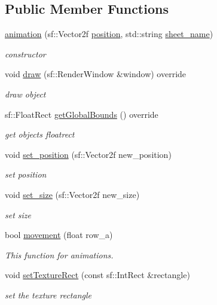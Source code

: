 \subsection*{Public Member Functions}
\begin{DoxyCompactItemize}
\item 
\hyperlink{classanimation_ab0a44a89f36d6f04c4e21e868441d693}{animation} (sf\+::\+Vector2f \hyperlink{classdrawable_a34679fa5ae82eee65dfd6b1b9f3c7cb6}{position}, std\+::string \hyperlink{classanimation_a5406569ef9a8e47a8e50a927063613f6}{sheet\+\_\+name})
\begin{DoxyCompactList}\small\item\em constructor \end{DoxyCompactList}\item 
void \hyperlink{classanimation_a20959b66d1c25007890bb40f0e876570}{draw} (sf\+::\+Render\+Window \&window) override
\begin{DoxyCompactList}\small\item\em draw object \end{DoxyCompactList}\item 
sf\+::\+Float\+Rect \hyperlink{classanimation_aae3322323bf3dea83723969f364e18e0}{get\+Global\+Bounds} () override
\begin{DoxyCompactList}\small\item\em get objects floatrect \end{DoxyCompactList}\item 
void \hyperlink{classanimation_ac461adb38b8241427150c4620ee31358}{set\+\_\+position} (sf\+::\+Vector2f new\+\_\+position)
\begin{DoxyCompactList}\small\item\em set position \end{DoxyCompactList}\item 
void \hyperlink{classanimation_a7c0b874294e81f3612590920fd845602}{set\+\_\+size} (sf\+::\+Vector2f new\+\_\+size)
\begin{DoxyCompactList}\small\item\em set size \end{DoxyCompactList}\item 
bool \hyperlink{classanimation_a79260eb98a4f77aa4b9f3b08cc8e5b59}{movement} (float row\+\_\+a)
\begin{DoxyCompactList}\small\item\em This function for animations. \end{DoxyCompactList}\item 
void \hyperlink{classanimation_a30e84ff71206b8ec4f82fd70ad776036}{set\+Texture\+Rect} (const sf\+::\+Int\+Rect \&rectangle)
\begin{DoxyCompactList}\small\item\em set the texture rectangle \end{DoxyCompactList}\end{DoxyCompactItemize}
